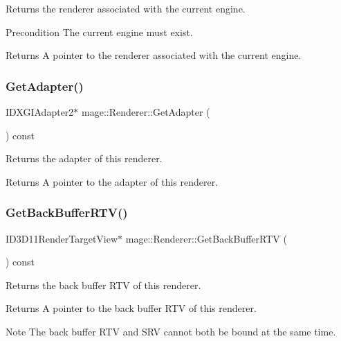 Returns the renderer associated with the current engine.

\begin{DoxyPrecond}{Precondition}
The current engine must exist. 
\end{DoxyPrecond}
\begin{DoxyReturn}{Returns}
A pointer to the renderer associated with the current engine. 
\end{DoxyReturn}
\hypertarget{classmage_1_1_renderer_a75fe0cdffda2e282dba1081dfddaa94d}{}\label{classmage_1_1_renderer_a75fe0cdffda2e282dba1081dfddaa94d} 
\subsubsection{\texorpdfstring{Get\+Adapter()}{GetAdapter()}}
{\footnotesize\ttfamily I\+D\+X\+G\+I\+Adapter2$\ast$ mage\+::\+Renderer\+::\+Get\+Adapter (\begin{DoxyParamCaption}{ }\end{DoxyParamCaption}) const\hspace{0.3cm}{\ttfamily [noexcept]}}

Returns the adapter of this renderer.

\begin{DoxyReturn}{Returns}
A pointer to the adapter of this renderer. 
\end{DoxyReturn}
\hypertarget{classmage_1_1_renderer_a19fed9809f31ff427440bbf6a167805e}{}\label{classmage_1_1_renderer_a19fed9809f31ff427440bbf6a167805e} 
\subsubsection{\texorpdfstring{Get\+Back\+Buffer\+R\+T\+V()}{GetBackBufferRTV()}}
{\footnotesize\ttfamily I\+D3\+D11\+Render\+Target\+View$\ast$ mage\+::\+Renderer\+::\+Get\+Back\+Buffer\+R\+TV (\begin{DoxyParamCaption}{ }\end{DoxyParamCaption}) const\hspace{0.3cm}{\ttfamily [noexcept]}}

Returns the back buffer R\+TV of this renderer.

\begin{DoxyReturn}{Returns}
A pointer to the back buffer R\+TV of this renderer. 
\end{DoxyReturn}
\begin{DoxyNote}{Note}
The back buffer R\+TV and S\+RV cannot both be bound at the same time. 
\end{DoxyNote}
\hypertarget{classmage_1_1_renderer_af0f19d31c5f01b79c2268128fde95206}{}\label{classmage_1_1_renderer_af0f19d31c5f01b79c2268128fde95206} 
